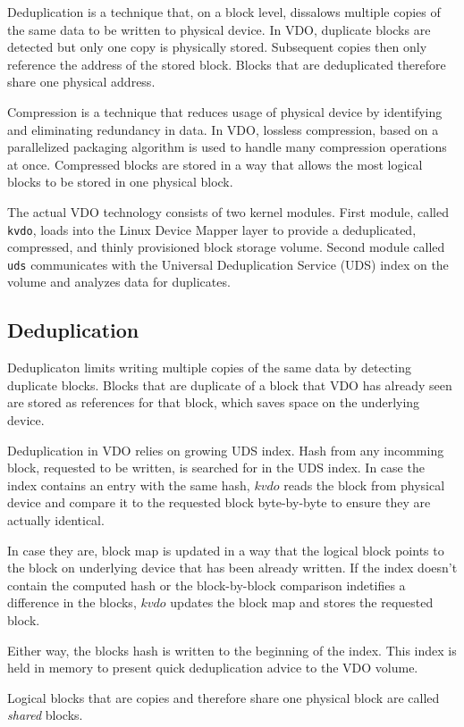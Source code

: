 \documentclass[
  color, %
  table, %
  lof,   %
  lot,   %
]{fithesis3}
\begin{document}
Deduplication is a technique that, on a block level, dissalows multiple copies of the same data to be written to physical device. In VDO, duplicate blocks are detected but only one copy is physically stored. Subsequent copies then only reference the address of the stored block. Blocks that are deduplicated therefore share one physical address.

Compression is a technique that reduces usage of physical device by identifying and eliminating redundancy in data. In VDO, lossless compression, based on a parallelized packaging algorithm is used to handle many compression operations at once. Compressed blocks are stored in a way that allows the most logical blocks to be stored in one physical block.

The actual VDO technology consists of two kernel modules. First module, called \texttt{kvdo}, loads into the Linux Device Mapper layer to provide a deduplicated, compressed, and thinly provisioned block storage volume. Second module called \texttt{uds} communicates with the Universal Deduplication Service (UDS) index on the volume and analyzes data for duplicates.


\subsection{Deduplication}
Deduplicaton limits writing multiple copies of the same data by detecting duplicate blocks. Blocks that are duplicate of a block that VDO has already seen are stored as references for that block, which saves space on the underlying device.

Deduplication in VDO relies on growing UDS index. Hash from any incomming block, requested to be written, is searched for in the UDS index. In case the index contains an entry with the same hash, $kvdo$ reads the block from physical device and compare it to the requested block byte-by-byte to ensure they are actually identical.

In case they are, block map is updated in a way that the logical block points to the block on underlying device that has been already written. If the index doesn't contain the computed hash or the block-by-block comparison indetifies a difference in the blocks, $kvdo$ updates the block map and stores the requested block.

Either way, the blocks hash is written to the beginning of the index. This index is held in memory to present quick deduplication advice to the VDO volume.

Logical blocks that are copies and therefore share one physical block are called \emph{shared} blocks.
\end{document}
